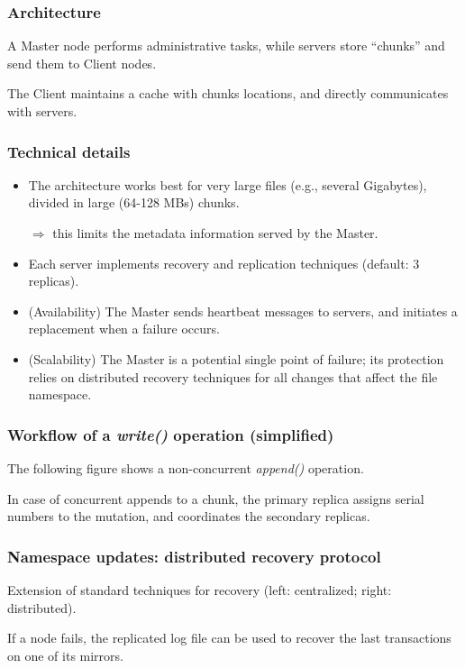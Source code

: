 \documentclass{beamer}
\begin{document}
\begin{frame}
\frametitle{Architecture}

A \alert{Master node} performs administrative tasks, while \alert{servers}
store ``chunks'' and send them to Client nodes.


The Client maintains a \alert{cache} with chunks locations, and directly
communicates with servers.

\end{frame}

\begin{frame}
\frametitle{Technical details}

\begin{itemize}
  \item The architecture works best for very large files (e.g., several
  Gigabytes), divided in large (64-128 MBs) chunks.
 
     $\Rightarrow$ this limits the metadata information served by the Master.
     
  \item Each server implements recovery and replication techniques (default: 3
  replicas).
  
  \item (\alert{Availability}) The Master sends heartbeat messages to servers,
  and initiates a replacement when a failure occurs.
  
  \item (\alert{Scalability}) The Master is a potential single point of failure;
  its protection relies on distributed recovery techniques for all changes that affect the
  file namespace.
\end{itemize}

\end{frame}


\begin{frame}
\frametitle{Workflow of a \textit{write()} operation (simplified)}

The following figure shows a non-concurrent \textit{append()} operation.


In case of concurrent appends to a chunk, the primary replica 
assigns serial numbers to the mutation, and coordinates the secondary replicas.

\end{frame}

\begin{frame}
\frametitle{Namespace updates: distributed recovery protocol}

Extension of standard techniques for recovery (left: centralized; right:
distributed).


If a node fails, the replicated log file can be used to recover the last
transactions on one of its mirrors.

\end{frame}
\end{document}
